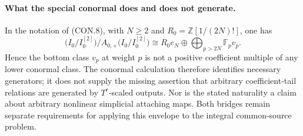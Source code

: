 \paragraph{What the special conormal does and does not generate.}
In the notation of (CON.8), with \(N\ge2\) and
\(R_0=\mathbb Z[1/(2N)!]\), one has
\[
 \bigl(I_0/I_0^{[2]}\bigr)/
 A_{0,+}\bigl(I_0/I_0^{[2]}\bigr)
 \cong R_0 e_N\oplus\bigoplus_{p>2N}\mathbb F_p v_p.
 \tag{SB.7}
\]
Hence the bottom class \(v_p\) at weight \(p\) is not a positive
coefficient multiple of any lower conormal class.
The conormal calculation therefore identifies necessary
generators; it does not supply the missing assertion that arbitrary
coefficient-tail relations are generated by \(T^r\)-scaled outputs.
Nor is the stated naturality a claim about arbitrary nonlinear
simplicial attaching maps. Both bridges remain separate requirements
for applying this envelope to the integral common-source problem.


